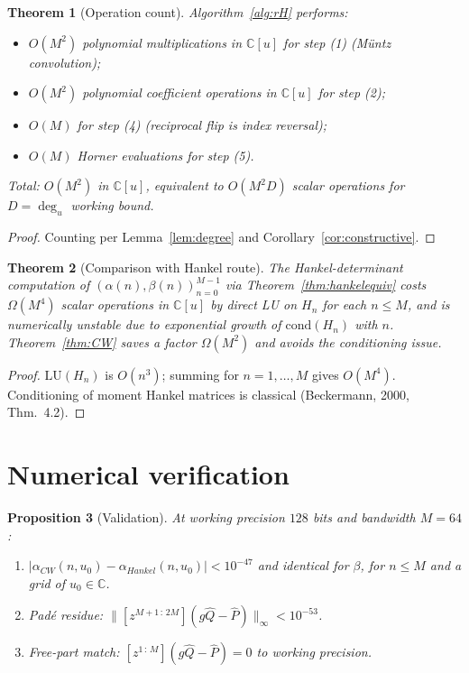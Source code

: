 \documentclass[11pt]{article}
\newtheorem{theorem}{Theorem}[section]
\newtheorem{proposition}[theorem]{Proposition}
\theoremstyle{definition}
\begin{document}
\begin{theorem}[Operation count]\label{thm:complexity}
Algorithm~\ref{alg:rH} performs:
\begin{itemize}[leftmargin=*]
  \item $O(M^{2})$ polynomial multiplications in $\mathbb{C}[u]$ for step (1) (M\"untz convolution);
  \item $O(M^{2})$ polynomial coefficient operations in $\mathbb{C}[u]$ for step (2);
  \item $O(M)$ for step (4) (reciprocal flip is index reversal);
  \item $O(M)$ Horner evaluations for step (5).
\end{itemize}
Total: $O(M^{2})$ in $\mathbb{C}[u]$, equivalent to
$O(M^{2} D)$ scalar operations for $D = \deg_{u}$ working bound.
\end{theorem}

\begin{proof}
Counting per Lemma~\ref{lem:degree} and Corollary~\ref{cor:constructive}.
\end{proof}

\begin{theorem}[Comparison with Hankel route]\label{thm:hankelcost}
The Hankel-determinant computation of
$(\alpha(n),\beta(n))_{n=0}^{M-1}$ via Theorem~\ref{thm:hankelequiv}
costs $\Omega(M^{4})$ scalar operations in $\mathbb{C}[u]$ by direct
LU on $H_{n}$ for each $n\leq M$, and is numerically unstable due to
exponential growth of $\mathrm{cond}(H_{n})$ with $n$. Theorem~\ref{thm:CW}
saves a factor $\Omega(M^{2})$ and avoids the conditioning issue.
\end{theorem}

\begin{proof}
$\mathrm{LU}(H_{n})$ is $O(n^{3})$; summing for $n=1,\ldots,M$ gives
$O(M^{4})$. Conditioning of moment Hankel matrices is classical
(Beckermann, 2000, Thm.~4.2).
\end{proof}

\section{Numerical verification}

\begin{proposition}[Validation]\label{prop:verify}
At working precision $128$ bits and bandwidth $M = 64$:
\begin{enumerate}[label=(\roman*),leftmargin=*]
  \item $|\alpha_{CW}(n,u_{0}) - \alpha_{Hankel}(n,u_{0})| < 10^{-47}$
        and identical for $\beta$, for $n\leq M$ and a grid of $u_{0}\in\mathbb{C}$.
  \item Pad\'e residue:
        $\|[z^{M+1\,:\,2M}](g\hat Q - \hat P)\|_{\infty} < 10^{-53}$.
  \item Free-part match: $[z^{1\,:\,M}](g\hat Q - \hat P) = 0$ to working precision.
\end{enumerate}
\end{proposition}
\end{document}
